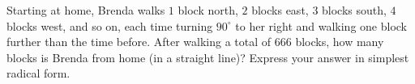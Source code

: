 Starting at home, Brenda walks $1$ block north, $2$ blocks east, $3$ blocks south, $4$ blocks west, and so on, each time turning $90^\circ$ to her right and walking one block further than the time before. After walking a total of $666$ blocks, how many blocks is Brenda from home (in a straight line)? Express your answer in simplest radical form.
